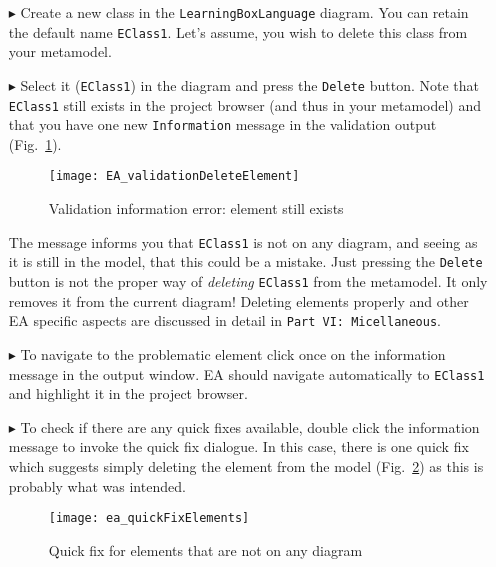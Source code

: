\begin{enumerate}
\item[$\blacktriangleright$] Create a new class in the \texttt{Learning\-Box\-Language} diagram.
You can retain the default name \texttt{EClass1}.
Let's assume, you wish to delete this class from your metamodel.

\item[$\blacktriangleright$] Select it (\texttt{EClass1}) in the diagram and press the \texttt{Delete} button.
Note that \texttt{EClass1} still exists in the project browser (and thus in your metamodel) and that you have one new \texttt{Information} message in the validation output (Fig.~\ref{fig:validation_information}).

\begin{figure}[htbp]
	\centering
  \texttt{[image: EA\_validationDeleteElement]}
	\caption{Validation information error: element still exists}
	\label{fig:validation_information}
\end{figure}

\pagebreak

The message informs you that \texttt{EClass1} is not on any diagram, and seeing as it is still in the model, that this could be a mistake.
Just pressing the \texttt{Delete} button is not the proper way of \emph{deleting} \texttt{EClass1} from the metamodel. It only removes it from the current diagram!
Deleting elements properly and other EA specific aspects are discussed in detail in \texttt{Part VI: Micellaneous}.


\item[$\blacktriangleright$] To navigate to the problematic element click once on the information message in the output window.
EA should navigate automatically to \texttt{EClass1} and highlight it in the project browser.

\item[$\blacktriangleright$] To check if there are any quick fixes available, double click the information message to invoke the quick fix dialogue.
In this case, there is one quick fix which suggests simply deleting the element from the model (Fig.~\ref{fig:quick-fix1}) as this is probably what was intended.

\begin{figure}[htbp]
	\centering
  \texttt{[image: ea\_quickFixElements]}
	\caption{Quick fix for elements that are not on any diagram}
	\label{fig:quick-fix1}
\end{figure}
\FloatBarrier


\end{enumerate}
